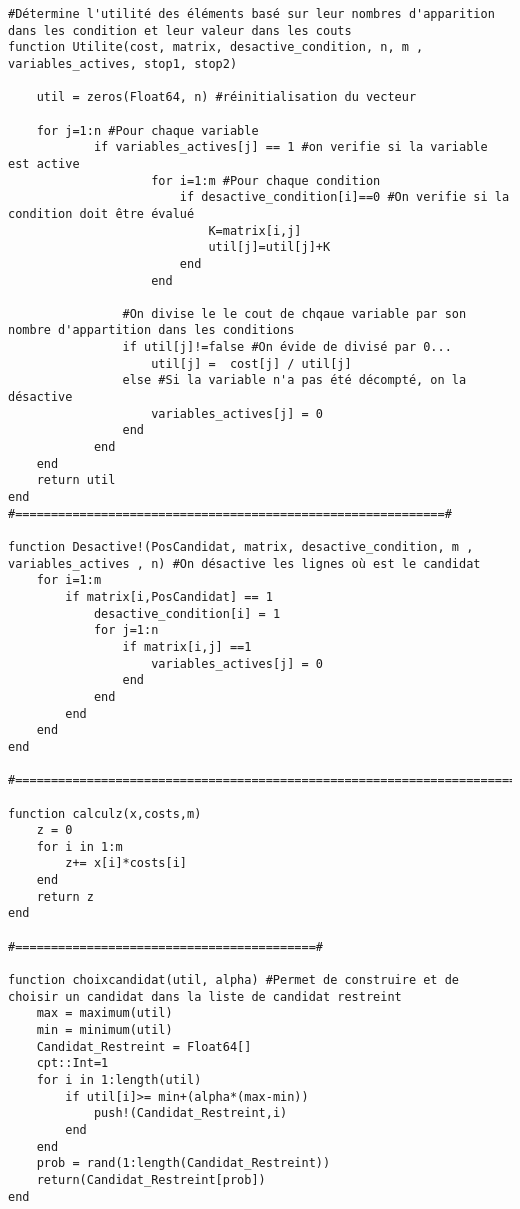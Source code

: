 \documentclass[10pt]{article}
\begin{document}
{\begin{lstlisting}
#Détermine l'utilité des éléments basé sur leur nombres d'apparition dans les condition et leur valeur dans les couts
function Utilite(cost, matrix, desactive_condition, n, m , variables_actives, stop1, stop2)

    util = zeros(Float64, n) #réinitialisation du vecteur

    for j=1:n #Pour chaque variable
            if variables_actives[j] == 1 #on verifie si la variable est active
                    for i=1:m #Pour chaque condition
                        if desactive_condition[i]==0 #On verifie si la condition doit être évalué
                            K=matrix[i,j]
                            util[j]=util[j]+K
                        end
                    end

                #On divise le le cout de chqaue variable par son nombre d'appartition dans les conditions
                if util[j]!=false #On évide de divisé par 0...
                    util[j] =  cost[j] / util[j]
                else #Si la variable n'a pas été décompté, on la désactive
                    variables_actives[j] = 0
                end
            end
    end
    return util
end
#============================================================#

function Desactive!(PosCandidat, matrix, desactive_condition, m , variables_actives , n) #On désactive les lignes où est le candidat
    for i=1:m
        if matrix[i,PosCandidat] == 1
            desactive_condition[i] = 1
            for j=1:n
                if matrix[i,j] ==1
                    variables_actives[j] = 0
                end
            end
        end
    end
end

#=========================================================================#

function calculz(x,costs,m)
    z = 0
    for i in 1:m
        z+= x[i]*costs[i]
    end
    return z
end

#==========================================#

function choixcandidat(util, alpha) #Permet de construire et de choisir un candidat dans la liste de candidat restreint
    max = maximum(util)
    min = minimum(util)
    Candidat_Restreint = Float64[]
    cpt::Int=1
    for i in 1:length(util)
        if util[i]>= min+(alpha*(max-min))
            push!(Candidat_Restreint,i)
        end
    end
    prob = rand(1:length(Candidat_Restreint))
    return(Candidat_Restreint[prob])
end

\end{lstlisting}
}
%
%
\end{document}
